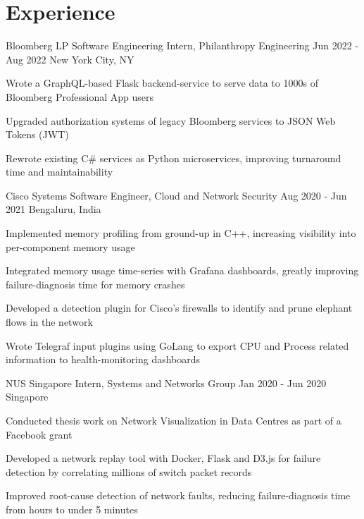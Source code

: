 \section{Experience}
\resumeSubHeadingListStart

\resumeExp
{Bloomberg LP}
{Software Engineering Intern, Philanthropy Engineering}
{Jun 2022 - Aug 2022}
{New York City, NY}

\resumeItemListStart
\item[$\bullet$] Wrote a GraphQL-based Flask backend-service to serve data to 1000s of Bloomberg Professional App users
\item[$\bullet$] Upgraded authorization systems of legacy Bloomberg services to JSON Web Tokens (JWT)
\item[$\bullet$] Rewrote existing C\# services as Python microservices, improving turnaround time and maintainability
\resumeItemListEnd


\resumeExp
{Cisco Systems}
{Software Engineer, Cloud and Network Security}
{Aug 2020 - Jun 2021}
{Bengaluru, India}

\resumeItemListStart
\item[$\bullet$] Implemented memory profiling from ground-up in C++, increasing visibility into per-component memory usage
        \item[$\bullet$] Integrated memory usage time-series with Grafana dashboards, greatly improving failure-diagnosis time for memory crashes
        \item[$\bullet$] Developed a detection plugin for Cisco's firewalls to identify and prune elephant flows in the network
        \item[$\bullet$] Wrote Telegraf input plugins using GoLang to export CPU and Process related information to health-monitoring dashboards
\resumeItemListEnd

\resumeExp
{NUS Singapore}
{Intern, Systems and Networks Group}
{Jan 2020 - Jun 2020}
{Singapore}

\resumeItemListStart
\item[$\bullet$] {Conducted thesis work on Network Visualization in Data Centres as part of a Facebook grant}
	    \item[$\bullet$] {Developed a network replay tool with Docker, Flask and D3.js for failure detection by correlating millions of switch packet records}
	    \item[$\bullet$] {Improved root-cause detection of network faults, reducing failure-diagnosis time from hours to under 5 minutes} 
\resumeItemListEnd

